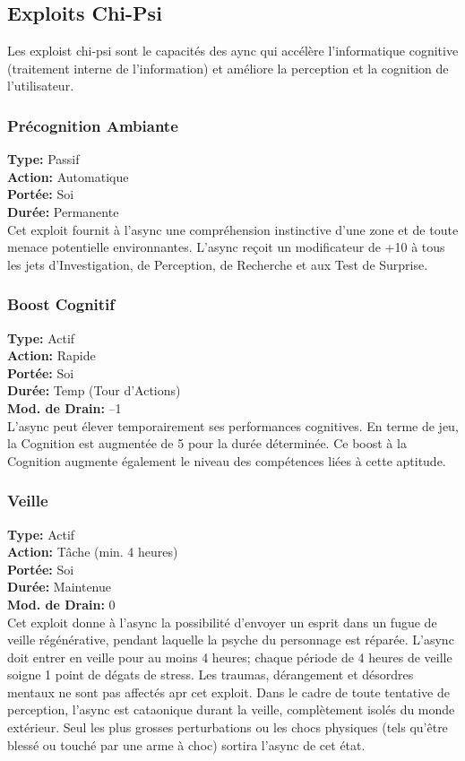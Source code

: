 \subsection{Exploits Chi-Psi} Les exploist chi-psi sont le capacités des aync qui accélère l'informatique cognitive (traitement interne de l'information) et améliore la perception et la cognition de l'utilisateur. 

\subsubsection{Précognition Ambiante} \textbf{Type:} Passif \\ \textbf{Action:} Automatique \\ \textbf{Portée:} Soi \\ \textbf{Durée:} Permanente \\ Cet exploit fournit à l'async une compréhension instinctive d'une zone et de toute menace potentielle environnantes. L'async reçoit un modificateur de +10 à tous les jets d'Investigation, de Perception, de Recherche et aux Test de Surprise. 

\subsubsection{Boost Cognitif} \textbf{Type:} Actif \\ \textbf{Action:} Rapide \\ \textbf{Portée:} Soi \\ \textbf{Durée:} Temp (Tour d'Actions) \\ \textbf{Mod. de Drain:} –1 \\ L'async peut élever temporairement ses performances cognitives. En terme de jeu, la Cognition est augmentée de 5 pour la durée déterminée. Ce boost à la Cognition augmente également  le niveau des compétences liées à cette aptitude. 

\subsubsection{Veille} \textbf{Type:} Actif \\ \textbf{Action:} Tâche (min. 4 heures) \\ \textbf{Portée:} Soi \\ \textbf{Durée:} Maintenue \\ \textbf{Mod. de Drain:} 0 \\ Cet exploit donne à l'async la possibilité d'envoyer un esprit dans un fugue de veille régénérative, pendant laquelle la psyche du personnage est réparée. L'async doit entrer en veille pour au moins 4 heures; chaque période de 4 heures de veille soigne 1 point de dégats de stress. Les traumas, dérangement et désordres mentaux ne sont pas affectés apr cet exploit. Dans le cadre de toute tentative de perception, l'async est cataonique durant la veille, complètement isolés du monde extérieur. Seul les plus grosses perturbations ou les chocs physiques (tels qu'être blessé ou touché par une arme à choc) sortira l'async de cet état. 

